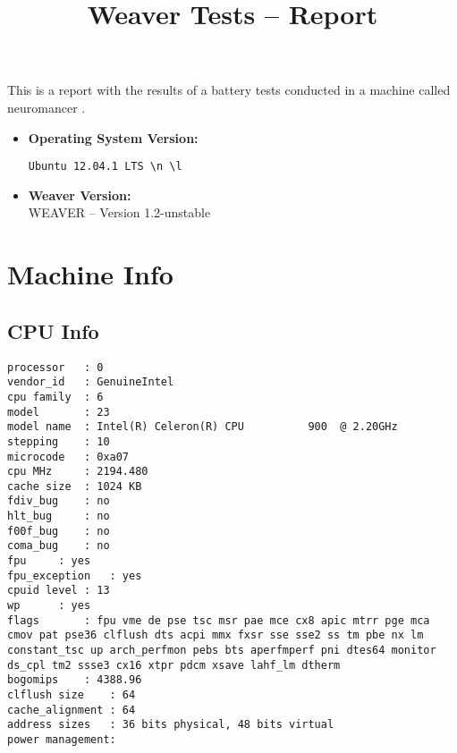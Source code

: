 \documentclass{article}
\title{Weaver Tests -- Report}
\begin{document}
\maketitle
This is a report with the results of a battery
tests conducted in a machine called 
neuromancer
.
\begin{itemize}
\item
\textbf{Operating System Version: }
\begin{verbatim}
Ubuntu 12.04.1 LTS \n \l

\end{verbatim}
\item
\textbf{Weaver Version: }\\
WEAVER -- Version 1.2-unstable
\end{itemize}
\section{Machine Info}
\subsection{CPU Info}
\begin{verbatim}
processor	: 0
vendor_id	: GenuineIntel
cpu family	: 6
model		: 23
model name	: Intel(R) Celeron(R) CPU          900  @ 2.20GHz
stepping	: 10
microcode	: 0xa07
cpu MHz		: 2194.480
cache size	: 1024 KB
fdiv_bug	: no
hlt_bug		: no
f00f_bug	: no
coma_bug	: no
fpu		: yes
fpu_exception	: yes
cpuid level	: 13
wp		: yes
flags		: fpu vme de pse tsc msr pae mce cx8 apic mtrr pge mca cmov pat pse36 clflush dts acpi mmx fxsr sse sse2 ss tm pbe nx lm constant_tsc up arch_perfmon pebs bts aperfmperf pni dtes64 monitor ds_cpl tm2 ssse3 cx16 xtpr pdcm xsave lahf_lm dtherm
bogomips	: 4388.96
clflush size	: 64
cache_alignment	: 64
address sizes	: 36 bits physical, 48 bits virtual
power management:

\end{verbatim}
\end{document}
